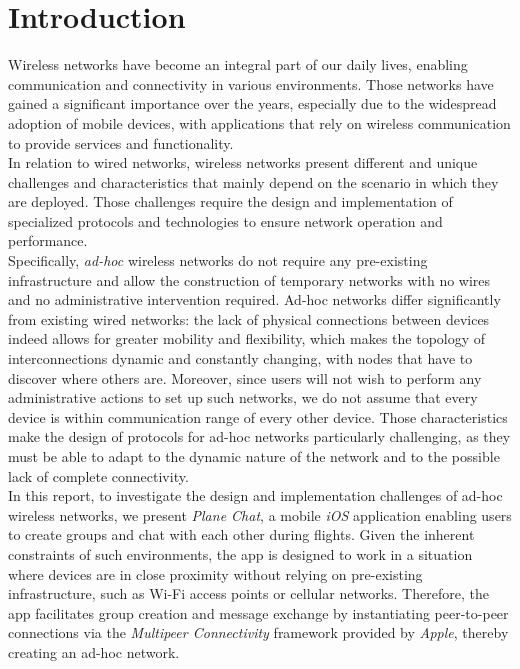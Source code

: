 \documentclass[conference]{IEEEtran}
\begin{document}
\section{Introduction}
Wireless networks have become an integral part of our daily lives, enabling
communication and connectivity in various environments. Those networks have
gained a significant importance over the years, especially due to the widespread
adoption of mobile devices, with applications that rely on wireless
communication to provide services and functionality. \\

In relation to wired networks, wireless networks present different and unique
challenges and characteristics that mainly depend on the scenario in which they
are deployed. Those challenges require the design and implementation of
specialized protocols and technologies to ensure network operation and
performance. \\
Specifically, \textit{ad-hoc} wireless networks do not require any
pre-existing infrastructure and allow the construction of temporary networks
with no wires and no administrative intervention required. Ad-hoc networks
differ significantly from existing wired networks: the lack of physical
connections between devices indeed allows for greater mobility and flexibility,
which makes the topology of interconnections dynamic and constantly changing,
with nodes that have to discover where others are. 
Moreover, since users will not wish to perform any administrative actions to
set up such networks, we do not assume that every device is within communication
range of every other device. Those characteristics make the design of protocols
for ad-hoc networks particularly challenging, as they must be able to adapt to
the dynamic nature of the network and to the possible lack of complete
connectivity. \\

In this report, to investigate the design and implementation challenges of ad-hoc
wireless networks, we present \textit{Plane Chat}, a mobile \textit{iOS}
application enabling users to create groups and chat with each other during
flights. Given the inherent constraints of such environments, the app is
designed to work in a situation where devices are in close proximity without
relying on pre-existing infrastructure, such as Wi-Fi access points or cellular 
networks. Therefore, the app facilitates group creation and message exchange by
instantiating peer-to-peer connections via the \textit{Multipeer Connectivity}
framework provided by \textit{Apple}, thereby creating an ad-hoc network. \\
\end{document}
